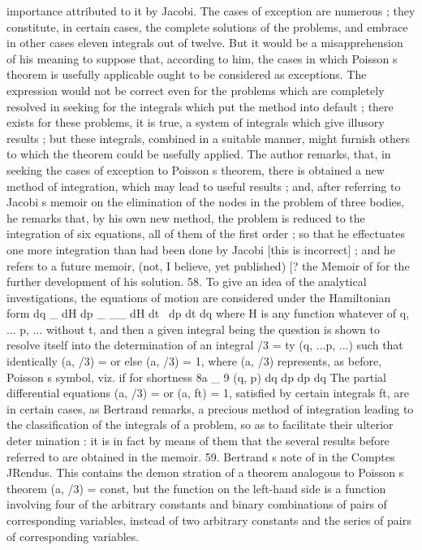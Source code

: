 \documentclass[11pt,a4paper]{book}
\begin{document}
importance
attributed
to
it
by
Jacobi.
The
cases
of
exception
are
numerous
;
they
constitute,
in
certain
cases,
the
complete
solutions
of
the
problems,
and
embrace
in
other
cases
eleven
integrals
out
of
twelve.
But
it would
be
a misapprehension of
his
meaning
to
suppose
that,
according
to
him,
the
cases
in
which
Poisson s
theorem
is
usefully
applicable
ought
to
be
considered
as
exceptions.
The
expression would
not be
correct
even
for the problems which
are completely resolved
in seeking
for
the
integrals
which
put
the
method
into
default
;
there
exists
for
these
problems,
it
is
true,
a
system
of
integrals
which
give
illusory
results
;
but
these
integrals,
combined
in
a
suitable manner, might
furnish
others
to which the theorem
could be
usefully applied.
The
author
remarks,
that,
in
seeking
the
cases
of
exception
to
Poisson s
theorem,
there
is
obtained
a
new
method
of
integration,
which
may
lead
to
useful
results
;
and,
after
referring
to Jacobi s
memoir
on
the
elimination
of
the
nodes
in the problem
of
three
bodies,
he
remarks
that,
by
his
own
new
method,
the
problem
is
reduced
to
the
integration
of
six
equations,
all
of
them
of
the
first
order
;
so
that
he
effectuates
one
more
integration
than
had
been
done
by
Jacobi
[this
is
incorrect]
;
and
he
refers
to
a
future
memoir,
(not,
I
believe,
yet
published)
[?
the
Memoir
of
for the
further development of
his
solution.
58.
To
give
an
idea
of
the
analytical
investigations,
the
equations
of motion
are
considered under the Hamiltonian form
dq _ dH
dp _ __ dH
dt~ dp
dt
dq
where H
is
any
function
whatever of
q,
... p, ...
without
t,
and
then
a given
integral
being
the question is shown to resolve itself into the determination of an integral
/3 = ty (q, ...p, ...)
such
that
identically
(a,
/3) =
or
else
(a,
/3) = 1,
where
(a,
/3)
represents,
as
before,
Poisson s symbol,
viz.
if for shortness
8a
_
9 (q, p)
dq dp
dp
dq
The
partial
differential equations
(a,
/3) =
or
(a,
ft) = 1,
satisfied by certain
integrals
ft,
are
in
certain
cases,
as
Bertrand
remarks, a
precious
method
of
integration leading
to
the
classification
of
the
integrals
of a problem,
so
as
to
facilitate
their
ulterior deter
mination
:
it
is
in
fact by
means
of them
that
the
several
results
before
referred
to
are obtained
in the memoir.
59.
Bertrand s
note
of
in
the
Comptes
JRendus.
This
contains
the
demon
stration
of a
theorem
analogous
to
Poisson s
theorem
(a,
/3) = const,
but
the
function
on
the
left-hand
side
is
a
function
involving
four
of
the
arbitrary
constants
and
binary combinations
of pairs
of corresponding
variables, instead of two
arbitrary constants
and the
series
of pairs of corresponding
variables.
\end{document}
